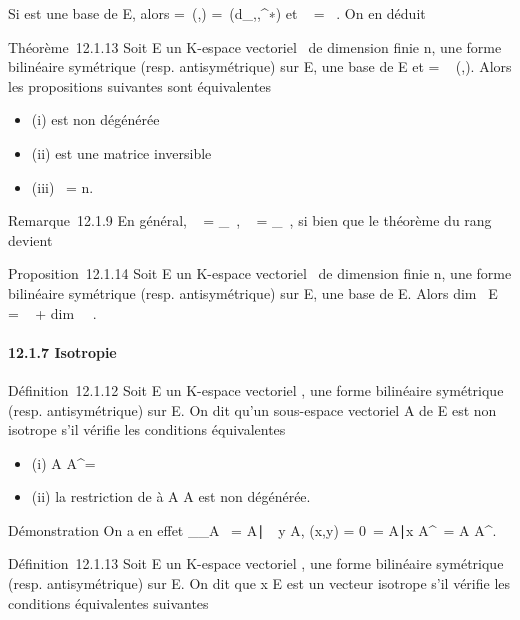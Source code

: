 \documentclass[]{article}
\begin{document}
Si  est une base de E, alors \Omega =\
\mathrmMat (\phi,) =\
\mathrmMat (d_\phi,,^∗) et
\mathrmrg~\phi
= \mathrmrg~\Omega. On en déduit

Théorème~12.1.13 Soit E un K-espace vectoriel ~de dimension finie n, \phi
une forme bilinéaire symétrique (resp. antisymétrique) sur E,  une base
de E et \Omega = \mathrmMat~
(\phi,\mathcal{E}). Alors les propositions suivantes sont équivalentes

\begin{itemize}
\itemsep1pt\parskip0pt
\item
  (i) \phi est non dégénérée
\item
  (ii) \Omega est une matrice inversible
\item
  (iii) \mathrmrg~\phi = n.
\end{itemize}

Remarque~12.1.9 En général,
\mathrmKer~\phi
= \mathrmKerd_\phi~,
\mathrmrg~\phi
= \mathrmrgd_\phi~, si
bien que le théorème du rang devient

Proposition~12.1.14 Soit E un K-espace vectoriel ~de dimension finie n,
\phi une forme bilinéaire symétrique (resp. antisymétrique) sur E,  une
base de E. Alors dim~ E
= \mathrmrg~\phi
+ dim~
\mathrmKer~\phi.

\paragraph{12.1.7 Isotropie}

Définition~12.1.12 Soit E un K-espace vectoriel , \phi une forme bilinéaire
symétrique (resp. antisymétrique) sur E. On dit qu'un sous-espace
vectoriel A de E est non isotrope s'il vérifie les conditions
équivalentes

\begin{itemize}
\itemsep1pt\parskip0pt
\item
  (i) A \bigcap A^\bot = \0\
\item
  (ii) la restriction de \phi à A \times A est non dégénérée.
\end{itemize}

Démonstration On a en effet
\mathrmKer\phi__A\timesA~
= \x \in
A∣\forall~~y \in A, \phi(x,y) =
0\ = \x \in
A∣x \in A^\bot\ = A \bigcap
A^\bot.

Définition~12.1.13 Soit E un K-espace vectoriel , \phi une forme bilinéaire
symétrique (resp. antisymétrique) sur E. On dit que x \in E est un vecteur
isotrope s'il vérifie les conditions équivalentes suivantes
\end{document}
